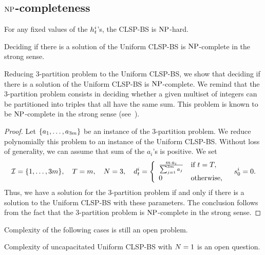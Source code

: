 \subsection{$\operatorname{NP}$-completeness}
\label{sec:PDP:deterministic:theoretical-results:NP-completeness}

For any fixed values of the $h_t^i$'s, the CLSP-BS is $\operatorname{NP}$-hard.

\begin{thm}
  Deciding if there is a solution of the Uniform CLSP-BS is $\operatorname{NP}$-complete in the strong sense.
\end{thm}



Reducing 3-partition problem to the Uniform CLSP-BS, we show that deciding if there is a solution of the Uniform CLSP-BS is $\operatorname{NP}$-complete. We remind that the 3-partition problem consists in deciding whether a given multiset of integers can be partitioned into triples that all have the same sum. This problem is known to be $\operatorname{NP}$-complete in the strong sense (see~\cite{Garey1979}).



\begin{proof}
Let $\crbracket{a_1,\ldots,a_{3m}}$ be an instance of the 3-partition problem.
We reduce polynomially this problem to an instance of the Uniform CLSP-BS.
Without loss of generality, we can assume that sum of the $a_i$'s is positive.
We set
\begin{equation}
  \REF=\range[1]{3m}
  ,\quad
  \horizon=m
  ,\quad
  \nbsetups=3
  ,\quad
  \demand_t^i
  =\left\{
  \begin{array}{ll}
  \frac{m\,a_i}{\sum_{j=1}^{3m}a_j} & \mbox{if}\ t=\horizon,
  \\
  0 & \mbox{otherwise,}\end{array}
  \right.
  \quad
  \inventory_0^i=0.
\end{equation}
Thus, we have a solution for the 3-partition problem if and only if there is a solution to the Uniform CLSP-BS with these parameters. The conclusion follows from the fact that the 3-partition problem is $\operatorname{NP}$-complete in the strong sense.
\end{proof}


Complexity of the following cases is still an open problem.
\begin{question}
Complexity of uncapacitated Uniform CLSP-BS with $N=1$ is an open question.
\end{question}

